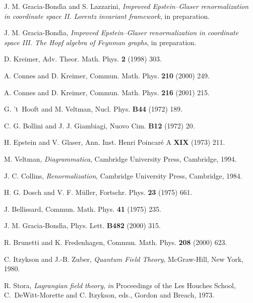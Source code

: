 \documentclass[a4paper,12pt]{article}
\providecommand{\7}{\dagger}           %
\theoremstyle{plain}
\theoremstyle{definition}
\begin{document}
\begin{thebibliography}{53}


J. M. Gracia-Bond\'{\i}a and S. Lazzarini,
\textsl{Improved Epstein--Glaser renormalization in coordinate space
II. Lorentz invariant framework}, in preparation.

J. M. Gracia-Bond\'{\i}a,
\textsl{Improved Epstein--Glaser renormalization in coordinate space
III. The Hopf algebra of Feynman graphs}, in preparation.

D. Kreimer,
Adv. Theor. Math. Phys. {\bf 2} (1998) 303.

A. Connes and D. Kreimer,
Commun. Math. Phys. {\bf 210} (2000) 249.

A. Connes and D. Kreimer,
Commun. Math. Phys. {\bf 216} (2001) 215.

G. 't~Hooft and M. Veltman,
Nucl. Phys. {\bf B44} (1972) 189.

C. G. Bollini and J. J. Giambiagi,
Nuovo Cim. {\bf B12} (1972) 20.

H. Epstein and V. Glaser,
Ann. Inst. Henri Poincar\'e A {\bf XIX} (1973) 211.

M. Veltman,
\textit{Diagrammatica},
Cambridge University Press, Cambridge, 1994.

J. C. Collins,
\textit{Renormalization},
Cambridge University Press, Cambridge, 1984.

H. G. Dosch and V. F. M\"uller,
Fortschr. Phys. {\bf 23} (1975) 661.

J. Bellissard,
Commun. Math. Phys. {\bf 41} (1975) 235.

J. M. Gracia-Bond\'{\i}a,
Phys. Lett. {\bf B482} (2000) 315.

R. Brunetti and K. Fredenhagen,
Commun. Math. Phys. {\bf 208} (2000) 623.

C. Itzykson and J.-B. Zuber,
\textit{Quantum Field Theory},
McGraw-Hill, New York, 1980.

R. Stora,
\textsl{Lagrangian field theory}, \textit{in}
Proceedings of the Les Houches School,
C.~DeWitt-Morette and C. Itzykson, eds.,
Gordon and Breach, 1973.


\end{thebibliography}
\end{document}
